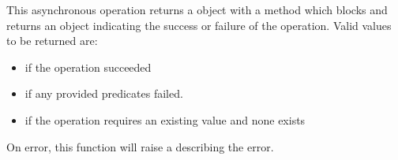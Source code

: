 This asynchronous operation returns a  object with a
 method which blocks and returns an object indicating the
success or failure of the operation.  Valid values to be returned are:

\begin{itemize}[noitemsep]
\item {} if the operation succeeded
\item {} if any provided predicates failed.
\item {} if the operation requires an existing value and none exists
\end{itemize}

On error, this function will raise a  describing
the error.
